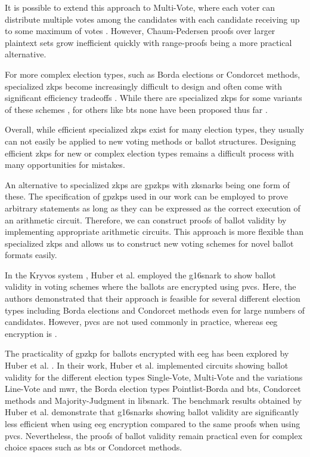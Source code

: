 It is possible to extend this approach to Multi-Vote, where each voter can distribute multiple votes among the candidates with each candidate receiving up to some maximum of votes \cite{adida_electing_2009,cortier_belenios_2019,gaudry_zk_2017}.
However, Chaum-Pedersen proofs over larger plaintext sets grow inefficient quickly with range-proofs \cite{morais_survey_2019} being a more practical alternative.

For more complex election types, such as Borda elections or Condorcet methods, specialized \glspl{zkp} become increasingly difficult to design and often come with significant efficiency tradeoffs \cite{huber_zk-snarks_2025}.
While there are specialized \glspl{zkp} for some variants of these schemes \cite{hutchison_non-interactive_2005,joaquim_how_2014,cortier_toolbox_2022}, for others like \gls{bts} none have been proposed thus far \cite{huber_zk-snarks_2025}.

Overall, while efficient specialized \glspl{zkp} exist for many election types, they usually can not easily be applied to new voting methods or ballot structures. 
Designing efficient \glspl{zkp} for new or complex election types remains a difficult process with many opportunities for mistakes.

An alternative to specialized \glspl{zkp} are \glspl{gpzkp} with \glspl{zksnark} being one form of these.
The specification of \glspl{gpzkp} used in our work can be employed to prove arbitrary statements as long as they can be expressed as the correct execution of an arithmetic circuit. 
Therefore, we can construct proofs of ballot validity by implementing appropriate arithmetic circuits.
This approach is more flexible than specialized \glspl{zkp} and allows us to construct new voting schemes for novel ballot formats easily.

In the Kryvos system \cite{huber_kryvos_2022}, Huber et al. employed the \gls{g16snark} \cite{groth_size_2016} to show ballot validity in voting schemes where the ballots are encrypted using \glspl{pvc}.
Here, the authors demonstrated that their approach is feasible for several different election types including Borda elections and Condorcet methods even for large numbers of candidates.
However, \glspl{pvc} are not used commonly in practice, whereas \gls{eeg} encryption is \cite{adida_electing_2009,cortier_belenios_2019}.

The practicality of \gls{gpzkp} for ballots encrypted with \gls{eeg} has been explored by Huber et al. \cite{huber_zk-snarks_2025}.
In their work, Huber et al. implemented circuits showing ballot validity for the different election types Single-Vote, Multi-Vote and the variations Line-Vote and \gls{mwr}, the Borda election types Pointlist-Borda and \gls{bts}, Condorcet methods and Majority-Judgment in libsnark.
The benchmark results obtained by Huber et al. demonstrate that \glspl{g16snark} showing ballot validity are significantly less efficient when using \gls{eeg} encryption compared to the same proofs when using \glspl{pvc}.
Nevertheless, the proofs of ballot validity remain practical even for complex choice spaces such as \gls{bts} or Condorcet methods.

